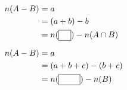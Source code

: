 $\begin{aligned} n(A-B)&=a\\ &=(a+b)-b\\ &=n(\blank)-n(A\cap B)\\[2mm] n(A-B)&=a\\ &=(a+b+c)-(b+c)\\ &=n(\blank[2.6em])-n(B) \end{aligned}$
